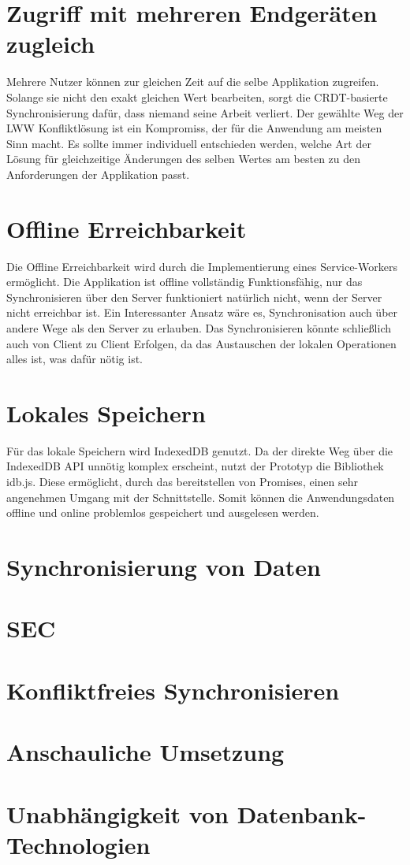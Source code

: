 \documentclass[a4paper, 12pt]{scrreprt}
\begin{document}
\section{Zugriff mit mehreren Endgeräten zugleich}
Mehrere Nutzer können zur gleichen Zeit auf die selbe Applikation zugreifen. Solange sie nicht den exakt gleichen Wert bearbeiten, sorgt die CRDT-basierte Synchronisierung dafür, dass niemand seine Arbeit verliert. Der gewählte Weg der \ac{LWW} Konfliktlösung ist ein Kompromiss, der für die Anwendung am meisten Sinn macht. Es sollte immer individuell entschieden werden, welche Art der Lösung für gleichzeitige Änderungen des selben Wertes am besten zu den Anforderungen der Applikation passt.

\section{Offline Erreichbarkeit}
Die Offline Erreichbarkeit wird durch die Implementierung eines Service-Workers ermöglicht. Die Applikation ist offline vollständig Funktionsfähig, nur das Synchronisieren über den Server funktioniert natürlich nicht, wenn der Server nicht erreichbar ist. Ein Interessanter Ansatz wäre es, Synchronisation auch über andere Wege als den Server zu erlauben. Das Synchronisieren könnte schließlich auch von Client zu Client Erfolgen, da das Austauschen der lokalen Operationen alles ist, was dafür nötig ist. 

\section{Lokales Speichern}
Für das lokale Speichern wird IndexedDB genutzt. Da der direkte Weg über die IndexedDB API unnötig komplex erscheint, nutzt der Prototyp die Bibliothek idb.js. Diese ermöglicht, durch das bereitstellen von Promises, einen sehr angenehmen Umgang mit der Schnittstelle. Somit können die Anwendungsdaten offline und online problemlos gespeichert und ausgelesen werden.

\section{Synchronisierung von Daten}



\section{SEC}
\section{Konfliktfreies Synchronisieren}
\section{Anschauliche Umsetzung}
\section{Unabhängigkeit von Datenbank-Technologien}


\newpage
\printbibliography
\end{document}

